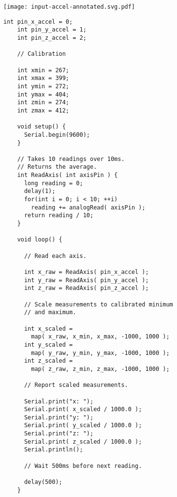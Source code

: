 \vspace{0.1in}
\begin{minipage}[t]{0.49\tw}

  \vspace{0.1in}
  \texttt{[image: input-accel-annotated.svg.pdf]}

\end{minipage}
\hfill
\begin{minipage}[t]{0.49\tw}
  \vspace{0.1in}
  \begin{Verbatim}[gobble=3,fontsize=\small]
    int pin_x_accel = 0;
    int pin_y_accel = 1;
    int pin_z_accel = 2;

    // Calibration

    int xmin = 267;
    int xmax = 399;
    int ymin = 272;
    int ymax = 404;
    int zmin = 274;
    int zmax = 412;

    void setup() {
      Serial.begin(9600);
    }

    // Takes 10 readings over 10ms.
    // Returns the average.
    int ReadAxis( int axisPin ) {
      long reading = 0;
      delay(1);
      for(int i = 0; i < 10; ++i)
        reading += analogRead( axisPin );
      return reading / 10;
    }

    void loop() {

      // Read each axis.

      int x_raw = ReadAxis( pin_x_accel );
      int y_raw = ReadAxis( pin_y_accel );
      int z_raw = ReadAxis( pin_z_accel );

      // Scale measurements to calibrated minimum
      // and maximum.

      int x_scaled =
        map( x_raw, x_min, x_max, -1000, 1000 );
      int y_scaled =
        map( y_raw, y_min, y_max, -1000, 1000 );
      int z_scaled =
        map( z_raw, z_min, z_max, -1000, 1000 );

      // Report scaled measurements.

      Serial.print("x: ");
      Serial.print( x_scaled / 1000.0 );
      Serial.print("y: ");
      Serial.print( y_scaled / 1000.0 );
      Serial.print("z: ");
      Serial.print( z_scaled / 1000.0 );
      Serial.println();

      // Wait 500ms before next reading.

      delay(500);
    }
  \end{Verbatim}
\end{minipage}
\vspace{0.1in}

